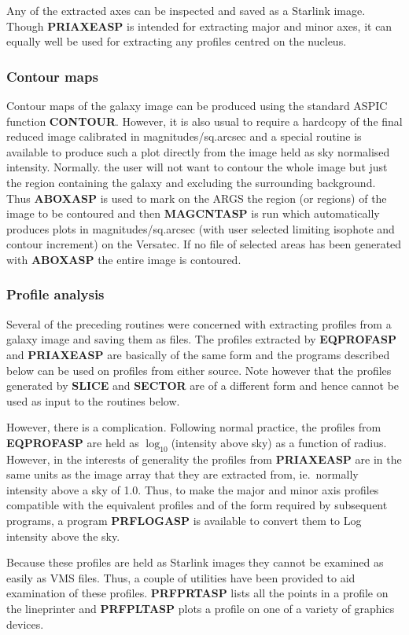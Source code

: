 Any of the extracted axes can be inspected and saved as a Starlink image.
Though {\bf PRIAXEASP} is intended for extracting major and minor axes, it can
equally well be used for extracting any profiles centred on the nucleus.
\subsubsection {Contour maps}
Contour maps of the galaxy image can be produced using the standard ASPIC
function {\bf CONTOUR}.
However, it is also usual to require a hardcopy of the final reduced image
calibrated in magnitudes/sq.arcsec and a special routine is available to
produce such a plot directly from the image held as sky normalised intensity.
Normally. the user will not want to contour the whole image but just the region
containing the galaxy and excluding the surrounding background.
Thus {\bf ABOXASP} is used to mark on the ARGS the region (or regions) of the
image to be contoured and then {\bf MAGCNTASP} is run which automatically
produces plots in magnitudes/sq.arcsec (with user selected limiting isophote
and contour increment) on the Versatec.
If no file of selected areas has been generated with {\bf ABOXASP} the entire
image is contoured.
\subsubsection {Profile analysis}
Several of the preceding routines were concerned with extracting profiles from
a galaxy image and saving them as files.
The profiles extracted by {\bf EQPROFASP} and {\bf PRIAXEASP} are basically of
the same form and the programs described below can be used on profiles from
either source.
Note however that the profiles generated by {\bf SLICE} and {\bf SECTOR} are of
a different form and hence cannot be used as input to the routines below.

However, there is a complication.
Following normal practice, the profiles from {\bf EQPROFASP} are held as
$\log _{10}$(intensity above sky) as a function of radius.
However, in the interests of generality the profiles from {\bf PRIAXEASP} are
in the same units as the image array that they are extracted from, ie.\ normally
intensity above a sky of 1.0.
Thus, to make the major and minor axis profiles compatible with the equivalent
profiles and of the form required by subsequent programs, a program
{\bf PRFLOGASP} is available to convert them to Log intensity above the sky.

Because these profiles are held as Starlink images they cannot be examined as
easily as VMS files.
Thus, a couple of utilities have been provided to aid examination of these
profiles.
{\bf PRFPRTASP} lists all the points in a profile on the lineprinter and
{\bf PRFPLTASP} plots a profile on one of a variety of graphics devices.

